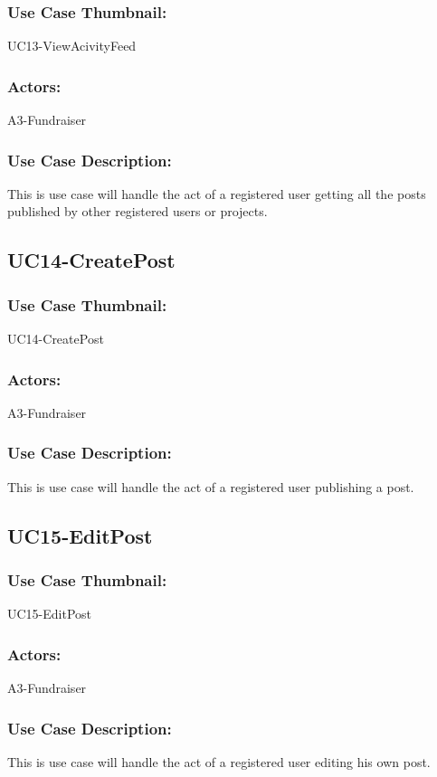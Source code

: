\documentclass[11pt, openany]{report}
\begin{document}
\subsubsection*{Use Case Thumbnail:}
UC13-ViewAcivityFeed
\subsubsection*{Actors:}
A3-Fundraiser
\subsubsection*{Use Case Description:}
This is use case will handle the act of a registered user getting all the posts published by other registered users or projects.


\subsection{UC14-CreatePost}
\label{sUC14}
\subsubsection*{Use Case Thumbnail:}
UC14-CreatePost
\subsubsection*{Actors:}
A3-Fundraiser
\subsubsection*{Use Case Description:}
This is use case will handle the act of a registered user publishing a post.

\subsection{UC15-EditPost}
\label{sUC15}
\subsubsection*{Use Case Thumbnail:}
UC15-EditPost
\subsubsection*{Actors:}
A3-Fundraiser
\subsubsection*{Use Case Description:}
This is use case will handle the act of a registered user editing his own post. 
\end{document}
